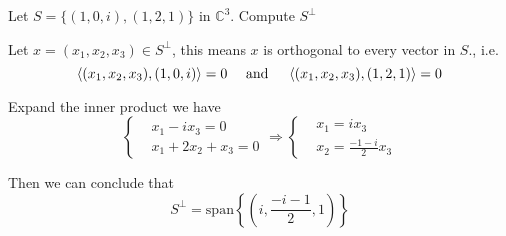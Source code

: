 \begin{homeworkProblem}

Let $S = \{(1,0,i), (1,2,1)\}$ in $\mathbb{C}^3$. Compute $S^{\perp}$

\solution

Let $x = (x_1, x_2, x_3) \in S^{\perp}$, this means $x$ is orthogonal to every
vector in $S$., i.e.
\[
\innerprod[(x_1, x_2, x_3)]{(1, 0, i)} = 0
\quad \text{ and } \quad
\innerprod[(x_1, x_2, x_3)]{(1, 2, 1)} = 0
\]

Expand the inner product we have \[
\left\{
\begin{aligned}
    &x_1 -ix_3 = 0\\
    &x_1 + 2x_2 + x_3 = 0
\end{aligned}
\right.
\Longrightarrow
\left\{
\begin{aligned}
    &x_1 = ix_3\\
    &x_2 = \frac{-1-i}{2}x_3
\end{aligned}
\right.
\]

Then we can conclude that \[
S^{\perp} = \mathrm{span}\left\{\left(i, \frac{-i-1}{2}, 1\right)\right\}
\]
\end{homeworkProblem}
